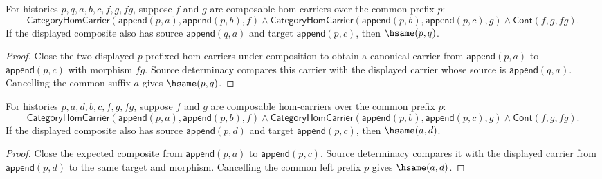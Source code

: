 \begin{theorem}
\label{thm:functor-prefix-hom-carrier-comp-source-prefix-deterministic}
For histories $p,q,a,b,c,f,g,fg$, suppose $f$ and $g$ are composable
hom-carriers over the common prefix $p$:
$$
\mathsf{CategoryHomCarrier}(\mathsf{append}(p,a),\mathsf{append}(p,b),f)
\land
\mathsf{CategoryHomCarrier}(\mathsf{append}(p,b),\mathsf{append}(p,c),g)
\land
\mathsf{Cont}(f,g,fg).
$$
If the displayed composite also has source $\mathsf{append}(q,a)$ and target
$\mathsf{append}(p,c)$, then $\hsame(p,q)$.
\end{theorem}
\begin{proof}
Close the two displayed $p$-prefixed hom-carriers under composition to obtain a
canonical carrier from $\mathsf{append}(p,a)$ to $\mathsf{append}(p,c)$ with
morphism $fg$. Source determinacy compares this carrier with the displayed
carrier whose source is $\mathsf{append}(q,a)$. Cancelling the common suffix
$a$ gives $\hsame(p,q)$.
\end{proof}

\begin{theorem}
\label{thm:functor-prefix-hom-carrier-comp-source-object-deterministic}
For histories $p,a,d,b,c,f,g,fg$, suppose $f$ and $g$ are composable
hom-carriers over the common prefix $p$:
$$
\mathsf{CategoryHomCarrier}(\mathsf{append}(p,a),\mathsf{append}(p,b),f)
\land
\mathsf{CategoryHomCarrier}(\mathsf{append}(p,b),\mathsf{append}(p,c),g)
\land
\mathsf{Cont}(f,g,fg).
$$
If the displayed composite also has source $\mathsf{append}(p,d)$ and target
$\mathsf{append}(p,c)$, then $\hsame(a,d)$.
\end{theorem}
\begin{proof}
Close the expected composite from $\mathsf{append}(p,a)$ to
$\mathsf{append}(p,c)$. Source determinacy compares it with the displayed
carrier from $\mathsf{append}(p,d)$ to the same target and morphism. Cancelling
the common left prefix $p$ gives $\hsame(a,d)$.
\end{proof}

